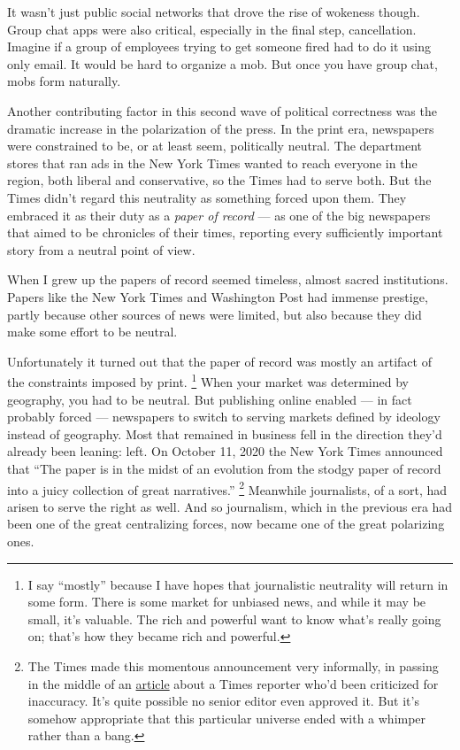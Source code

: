 \documentclass[12pt]{book}
\begin{document}
It wasn't just public social networks that drove the rise of wokeness
though. Group chat apps were also critical, especially in the final
step, cancellation. Imagine if a group of employees trying to get
someone fired had to do it using only email. It would be hard to
organize a mob. But once you have group chat, mobs form naturally.

Another contributing factor in this second wave of political correctness
was the dramatic increase in the polarization of the press. In the print
era, newspapers were constrained to be, or at least seem, politically
neutral. The department stores that ran ads in the New York Times wanted
to reach everyone in the region, both liberal and conservative, so the
Times had to serve both. But the Times didn't regard this neutrality as
something forced upon them. They embraced it as their duty as a
\emph{paper of record} --- as one of the big newspapers that aimed to be
chronicles of their times, reporting every sufficiently important story
from a neutral point of view.

When I grew up the papers of record seemed timeless, almost sacred
institutions. Papers like the New York Times and Washington Post had
immense prestige, partly because other sources of news were limited, but
also because they did make some effort to be neutral.

Unfortunately it turned out that the paper of record was mostly an
artifact of the constraints imposed by print. \footnote{I say ``mostly'' because I have hopes that journalistic
neutrality will return in some form. There is some market for unbiased
news, and while it may be small, it's valuable. The rich and powerful
want to know what's really going on; that's how they became rich and
powerful.}
When your market was determined by geography, you had to be neutral. But
publishing online enabled --- in fact probably forced --- newspapers to
switch to serving markets defined by ideology instead of geography. Most
that remained in business fell in the direction they'd already been
leaning: left. On October 11, 2020 the New York Times announced that
``The paper is in the midst of an evolution from the stodgy paper of
record into a juicy collection of great narratives.''
\footnote{The Times made this momentous announcement very informally, in
passing in the middle of an
\href{https://www.nytimes.com/2020/10/11/business/media/new-york-times-rukmini-callimachi-caliphate.html}{article}
about a Times reporter who'd been criticized for inaccuracy. It's quite
possible no senior editor even approved it. But it's somehow appropriate
that this particular universe ended with a whimper rather than a bang.} Meanwhile journalists, of a sort, had arisen to
serve the right as well. And so journalism, which in the previous era
had been one of the great centralizing forces, now became one of the
great polarizing ones.
\end{document}
